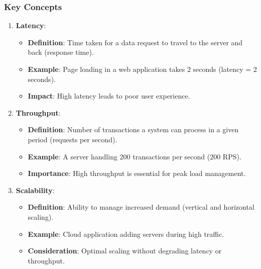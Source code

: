 \documentclass[aspectratio=169]{beamer}
\begin{document}
\begin{frame}[fragile]
    \frametitle{Key Concepts}
    \begin{enumerate}
        \item \textbf{Latency}:
            \begin{itemize}
                \item \textbf{Definition}: Time taken for a data request to travel to the server and back (response time).
                \item \textbf{Example}: Page loading in a web application takes 2 seconds (latency = 2 seconds).
                \item \textbf{Impact}: High latency leads to poor user experience.
            \end{itemize}
        \item \textbf{Throughput}:
            \begin{itemize}
                \item \textbf{Definition}: Number of transactions a system can process in a given period (requests per second).
                \item \textbf{Example}: A server handling 200 transactions per second (200 RPS).
                \item \textbf{Importance}: High throughput is essential for peak load management.
            \end{itemize}
        \item \textbf{Scalability}:
            \begin{itemize}
                \item \textbf{Definition}: Ability to manage increased demand (vertical and horizontal scaling).
                \item \textbf{Example}: Cloud application adding servers during high traffic.
                \item \textbf{Consideration}: Optimal scaling without degrading latency or throughput.
            \end{itemize}
    \end{enumerate}
\end{frame}
\end{document}
